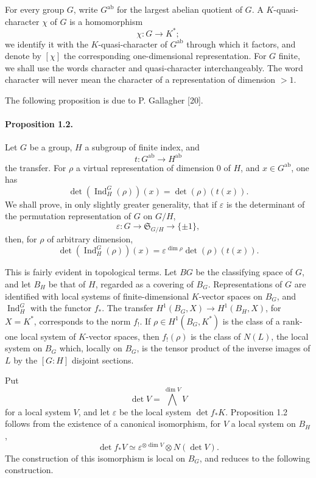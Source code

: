 \documentclass[10pt]{article}
\newcommand{\Ind}{\operatorname{Ind}}
\providecommand{\Ind}{\operatorname{Ind}}
\begin{document}
For every group \(G\), write \(G^{\mathrm{ab}}\) for the largest abelian quotient of \(G\). A \(K\)-quasi-character \(\chi\) of \(G\) is a homomorphism
\[
\chi:G\longrightarrow K^*;
\]
we identify it with the \(K\)-quasi-character of \(G^{\mathrm{ab}}\) through which it factors, and denote by \([\chi]\) the corresponding one-dimensional representation. For \(G\) finite, we shall use the words character and quasi-character interchangeably. The word character will never mean the character of a representation of dimension \(>1\).

The following proposition is due to P. Gallagher [20].

\paragraph{Proposition 1.2.} Let \(G\) be a group, \(H\) a subgroup of finite index, and
\[
t:G^{\mathrm{ab}}\longrightarrow H^{\mathrm{ab}}
\]
the transfer. For \(\rho\) a virtual representation of dimension \(0\) of \(H\), and \(x\in G^{\mathrm{ab}}\), one has
\[
\det(\Ind_H^G(\rho))(x)=\det(\rho)(t(x)).
\]
We shall prove, in only slightly greater generality, that if \(\varepsilon\) is the determinant of the permutation representation of \(G\) on \(G/H\),
\[
\varepsilon:G\longrightarrow \mathfrak S_{G/H}\longrightarrow \{\pm1\},
\]
then, for \(\rho\) of arbitrary dimension,
\[
\det(\Ind_H^G(\rho))(x)=\varepsilon^{\dim\rho}\det(\rho)(t(x)).
\]

This is fairly evident in topological terms. Let \(BG\) be the classifying space of \(G\), and let \(B_H\) be that of \(H\), regarded as a covering of \(B_G\). Representations of \(G\) are identified with local systems of finite-dimensional \(K\)-vector spaces on \(B_G\), and \(\Ind_H^G\) with the functor \(f_*\). The transfer \(H^1(B_G,X)\to H^1(B_H,X)\), for \(X=K^*\), corresponds to the norm \(f_!\). If \(\rho\in H^1(B_G,K^*)\) is the class of a rank-one local system of \(K\)-vector spaces, then \(f_!(\rho)\) is the class of \(N(L)\), the local system on \(B_G\) which, locally on \(B_G\), is the tensor product of the inverse images of \(L\) by the \([G:H]\) disjoint sections.

Put
\[
\det V=\bigwedge^{\dim V}V
\]
for a local system \(V\), and let \(\varepsilon\) be the local system \(\det f_*K\). Proposition 1.2 follows from the existence of a canonical isomorphism, for \(V\) a local system on \(B_H\),
\[
\det f_*V\simeq \varepsilon^{\otimes\dim V}\otimes N(\det V).
\]
The construction of this isomorphism is local on \(B_G\), and reduces to the following construction.
\end{document}
